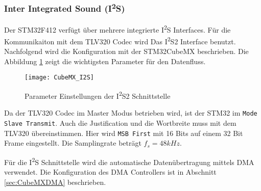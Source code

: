 \subsubsection{Inter Integrated Sound (I\textsuperscript{2}S)}
\label{sec:CubeMXI2S}

Der STM32F412 verfügt über mehrere integrierte I\textsuperscript{2}S Interfaces. 
Für die Kommunikaiton mit dem TLV320 Codec wird Das I\textsuperscript{2}S2 Interface benutzt.
Nachfolgend wird die Konfiguration mit der STM32CubeMX beschrieben.
Die Abbildung \ref{pic:CubeMX_I2S} zeigt die wichtigsten Parameter für den Datenfluss.

\begin{figure}[H]
	\centering
	\texttt{[image: CubeMX\_I2S]}
	\caption{Parameter Einstellungen der I\textsuperscript{2}S2 Schnittstelle}
	\label{pic:CubeMX_I2S}
\end{figure}

Da der TLV320 Codec im Master Modus betrieben wird, ist der STM32 im \texttt{Mode Slave Transmit}.
Auch die Justification und die Wortbreite muss mit dem TLV320 übereinstimmen. Hier wird \texttt{MSB First} mit 16 Bits auf einem 32 Bit Frame eingestellt.
Die Samplingrate beträgt $f_s = 48\si{kHz}$.

Für die I\textsuperscript{2}S Schnittstelle wird die automatische Datenübertragung mittels DMA verwendet. Die Konfiguration des DMA Controllers ist in Abschnitt \ref{sec:CubeMXDMA} beschrieben.

